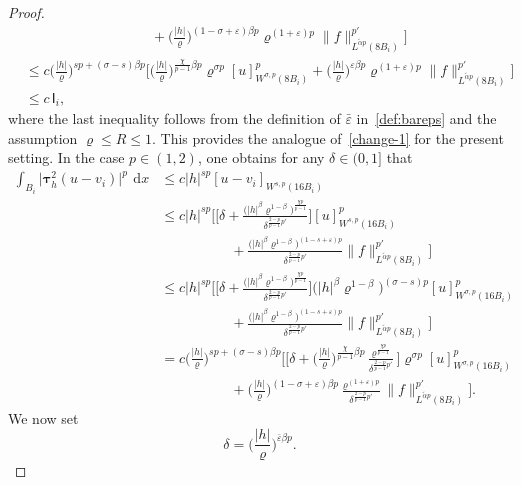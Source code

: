 \documentclass[10pt,letterpaper]{amsart}
\theoremstyle{definition}
\numberwithin{theorem}{section}
\numberwithin{equation}{section}
\newcommand{\1}{\ensuremath{\mathds{1}}}
\newcommand\sfI{{\boldsymbol{\mathsf I}}}
\renewcommand{\epsilon}{\varepsilon}
\renewcommand{\rho}{\varrho}
\renewcommand{\epsilon}{\varepsilon}
\renewcommand{\rho}{\varrho}
\renewcommand{\d}{\:\! \mathrm{d}}
\numberwithin{equation}{section}
\begin{document}
\begin{proof}
\begin{align*}
    &\qquad\qquad\qquad\qquad\quad +
    \Big(\frac{|h|}{\rho}\Big)^{(1-\sigma+\epsilon)\beta p} \rho^{(1+\epsilon)p}
    \|f\|_{L^{\tilde\alpha p}(8B_i)}^{p'} \bigg] \\
    &\le
    c \Big(\frac{|h|}{\rho}\Big)^{sp+(\sigma-s)\beta p} 
    \bigg[ 
    \Big(\frac{|h|}{\rho}\Big)^{\frac{\chi}{p-1}\beta p} \rho^{\sigma p} [u]^p_{W^{\sigma,p}(8B_i)} 
    +
    \Big(\frac{|h|}{\rho}\Big)^{\epsilon\beta p} \rho^{(1+\epsilon)p}
    \|f\|_{L^{\tilde\alpha p}(8B_i)}^{p'} \bigg]\\
    &\le 
    c\, \sfI_i,
\end{align*}
where the last inequality follows from the definition of $\bar\epsilon$ in~\eqref{def:bareps} and the assumption $\rho \le R \le 1$. This provides the analogue of~\eqref{change-1} for the present setting.
In the case $p\in(1,2)$, one obtains for any $\delta \in (0,1]$ that
\begin{align*}
    \int_{B_i} \big|\boldsymbol\tau_h^2 (u - v_i)\big|^p \,\d x
    &\le
    c |h|^{sp} [u-v_i]_{W^{s,p}(16B_i)} \\
    &\le
    c |h|^{sp} \Bigg[
    \bigg[\delta +
    \frac{\big(|h|^\beta\rho^{1-\beta}\big)^{\frac{\chi p}{p-1}}}{\delta^{\frac{2-p}{p-1}p'}}\bigg][u]^p_{W^{s,p}(16B_i)} \\
    &\qquad\qquad\quad +
    \frac{\big(|h|^\beta\rho^{1-\beta}\big)^{(1-s+\epsilon)p}}{\delta^{\frac{2-p}{p-1}p'}} 
    \|f\|_{L^{\tilde\alpha p}(8B_i)}^{p'}\Bigg] \nonumber\\
    &\le
    c |h|^{sp} \Bigg[
    \bigg[\delta +
    \frac{\big(|h|^\beta\rho^{1-\beta}\big)^{\frac{\chi p}{p-1}}}{\delta^{\frac{2-p}{p-1}p'}}\bigg]\big(|h|^\beta\rho^{1-\beta}\big)^{(\sigma-s)p} [u]_{W^{\sigma,p}(16B_i)}^p \\
    &\qquad\qquad\quad + 
    \frac{\big(|h|^\beta\rho^{1-\beta}\big)^{(1-s+\epsilon)p}}{\delta^{\frac{2-p}{p-1}p'}}
    \|f\|_{L^{\tilde\alpha p}(8B_i)}^{p'} \Bigg] \\
    &=
    c \Big(\frac{|h|}{\rho}\Big)^{sp+(\sigma-s)\beta p} \Bigg[
    \bigg[\delta +
    \Big(\frac{|h|}{\rho}\Big)^{\frac{\chi}{p-1}\beta p} \frac{\rho^{\frac{\chi p}{p-1}}}{\delta^{\frac{2-p}{p-1}p'}}\bigg]
    \rho^{\sigma p}[u]_{W^{\sigma,p}(16B_i)}^p \\
    &\qquad\qquad\quad + 
    \Big(\frac{|h|}{\rho}\Big)^{(1-\sigma+\epsilon)\beta p} \frac{\rho^{(1+\epsilon)p}}{\delta^{\frac{2-p}{p-1}p'}}
    \|f\|_{L^{\tilde\alpha p}(8B_i)}^{p'} \Bigg].
\end{align*}
We now set 
\[
\delta=\Big(\frac{|h|}{\rho}\Big)^{\bar\epsilon\beta p}.
\]
\end{proof}
\end{document}
